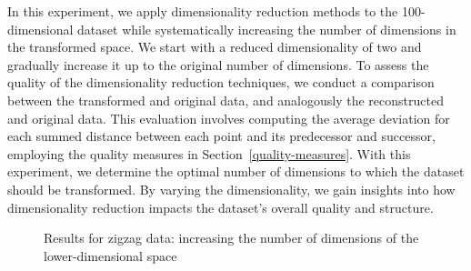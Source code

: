 \documentclass[pdftex,12pt,a4paper]{report}
\begin{document}
In this experiment, we apply dimensionality reduction methods to the 100-dimensional dataset while systematically increasing the number of dimensions in the transformed space.
We start with a reduced dimensionality of two and gradually increase it up to the original number of dimensions.
To assess the quality of the dimensionality reduction techniques, we conduct a comparison between the transformed and original data, and analogously the reconstructed and original data.
This evaluation involves computing the average deviation for each summed distance between each point and its predecessor and successor, employing the quality measures in Section~\ref{quality-measures}.
With this experiment, we determine the optimal number of dimensions to which the dataset should be transformed.
By varying the dimensionality, we gain insights into how dimensionality reduction impacts the dataset's overall quality and structure.

\begin{figure}[!htb]
    \caption{Results for zigzag data: increasing the number of dimensions of the lower-dimensional space}\label{fig:avg_dev_dyn_low_zigzag}
\end{figure}
\end{document}
